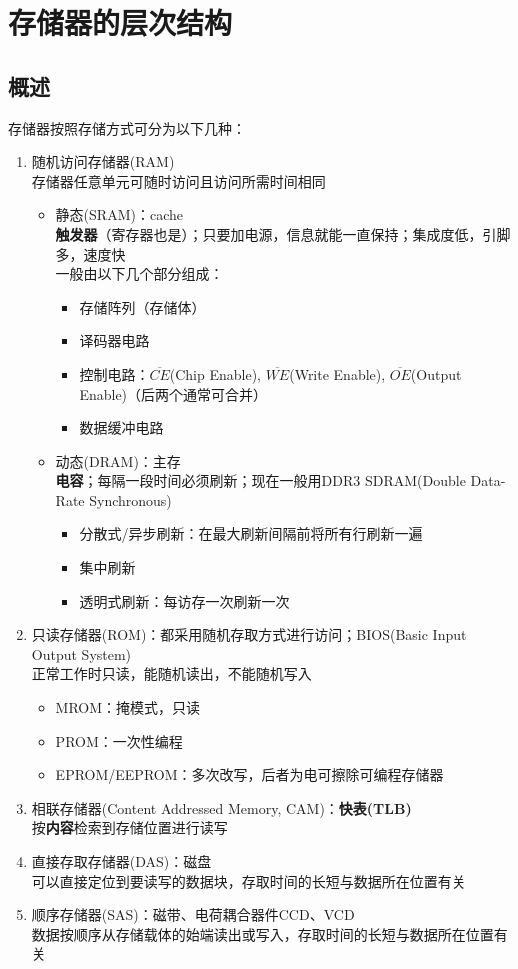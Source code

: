 
\section{存储器的层次结构}
\subsection{概述}
存储器按照存储方式可分为以下几种：
\begin{enumerate}
	\item 随机访问存储器(RAM)\\
	存储器任意单元可随时访问且访问所需时间相同
	\begin{itemize}
		\item 静态(SRAM)：cache\\
		\textbf{触发器}（寄存器也是）；只要加电源，信息就能一直保持；集成度低，引脚多，速度快\\
		一般由以下几个部分组成：
		\begin{itemize}
			\item 存储阵列（存储体）
			\item 译码器电路
			\item 控制电路：$\overline{CE}$(Chip Enable), $\overline{WE}$(Write Enable), $\overline{OE}$(Output Enable)（后两个通常可合并）
			\item 数据缓冲电路
		\end{itemize}
		\item 动态(DRAM)：主存\\
		\textbf{电容}；每隔一段时间必须刷新；现在一般用DDR3 SDRAM(Double Data-Rate Synchronous)\\
		\begin{itemize}
			\item 分散式/异步刷新：在最大刷新间隔前将所有行刷新一遍
			\item 集中刷新
			\item 透明式刷新：每访存一次刷新一次
		\end{itemize}
	\end{itemize}
	\item 只读存储器(ROM)：都采用随机存取方式进行访问；BIOS(Basic Input Output System)\\
	正常工作时只读，能随机读出，不能随机写入
	\begin{itemize}
		\item MROM：掩模式，只读
		\item PROM：一次性编程
		\item EPROM/EEPROM：多次改写，后者为电可擦除可编程存储器
	\end{itemize}
	\item 相联存储器(Content Addressed Memory, CAM)：\textbf{快表(TLB)}\\
	按\textbf{内容}检索到存储位置进行读写
	\item 直接存取存储器(DAS)：磁盘\\
	可以直接定位到要读写的数据块，存取时间的长短与数据所在位置有关
	\item 顺序存储器(SAS)：磁带、电荷耦合器件CCD、VCD\\
	数据按顺序从存储载体的始端读出或写入，存取时间的长短与数据所在位置有关
\end{enumerate}
